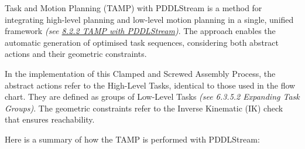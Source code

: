 Task and Motion Planning (TAMP) with PDDLStream is a method for integrating high-level planning and low-level motion planning in a single, unified framework \textit{(see \ul{8.2.2 TAMP with PDDLStream})}. The approach enables the automatic generation of optimised task sequences, considering both abstract actions and their geometric constraints. 

In the implementation of this Clamped and Screwed Assembly Process, the abstract actions refer to the High-Level Tasks, identical to those used in the flow chart. They are defined as groups of Low-Level Tasks \textit{(see 6.3.5.2 Expanding Task Groups)}. The geometric constraints refer to the Inverse Kinematic (IK) check that ensures reachability. 

Here is a summary of how the TAMP is performed with PDDLStream:

